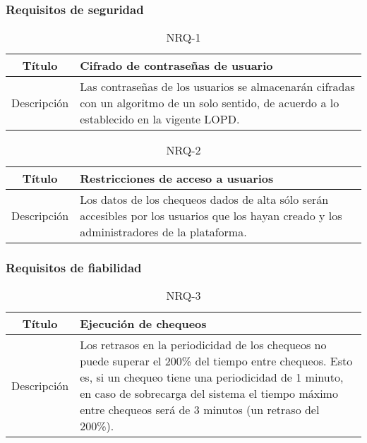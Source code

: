 \subsubsection{Requisitos de seguridad}

\begin{table}[h!]
  \centering
  \begin{tabularx}{\textwidth}{|c|X|}
    \hline
    Título & Cifrado de contraseñas de usuario \\

    \hline

    Descripción & Las contraseñas de los usuarios se almacenarán cifradas con un
    algoritmo de un solo sentido, de acuerdo a lo establecido en la vigente \ac{LOPD}. \\


    \hline
  \end{tabularx}
  \caption{NRQ-1}
\end{table}

\begin{table}[h!]
  \centering
  \begin{tabularx}{\textwidth}{|c|X|}
    \hline
    Título & Restricciones de acceso a usuarios \\

    \hline

    Descripción & Los datos de los chequeos dados de alta sólo serán accesibles
    por los usuarios que los hayan creado y los administradores de la plataforma. \\


    \hline
  \end{tabularx}
  \caption{NRQ-2}
\end{table}

\FloatBarrier
\subsubsection{Requisitos de fiabilidad}


\begin{table}[h!]
  \centering
  \begin{tabularx}{\textwidth}{|c|X|}
    \hline
    Título & Ejecución de chequeos \\

    \hline

    Descripción & Los retrasos en la periodicidad de los chequeos no puede
    superar el 200\% del tiempo entre chequeos. Esto es, si un chequeo tiene una
    periodicidad de 1 minuto, en caso de sobrecarga del sistema el tiempo máximo
    entre chequeos será de 3 minutos (un retraso del 200\%). \\

    \hline
  \end{tabularx}
  \caption{NRQ-3}
\end{table}


